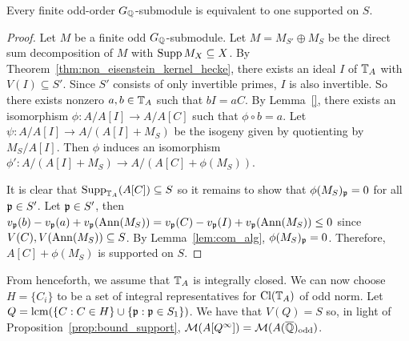 \documentclass[11pt, proquest]{uwthesis}
\begin{document}
\begin{proposition}%
    \label{prop:bound_support}
    Every finite odd-order $G_{\mathbb{Q}}$-submodule is equivalent to one supported on
    $S$.
\end{proposition}
\begin{proof}
    Let $M$ be a finite odd $G_{\mathbb{Q}}$-submodule. Let $M=M_{S'}\oplus M_S$ be the
    direct sum decomposition of $M$ with $\operatorname{Supp} M_X \subseteq X$. By
    Theorem~\ref{thm:non_eisenstein_kernel_hecke}, there exists an ideal
    $I$ of $\mathbb{T}_A$ with $V(I)\subseteq S'$. Since $S'$ consists of only
    invertible primes, $I$ is also invertible. So there exists nonzero $a,b\in
    \mathbb{T}_A$ such that $bI=aC$. By Lemma~\ref{}, there exists an isomorphism
    $\phi:A/A[I]\to A/A[C]$ such that $\phi\circ b = a$. Let $\psi:A/A[I]\to
    A/(A[I]+M_S)$ be the isogeny given by quotienting by $M_S/A[I]$. Then
    $\phi$ induces an isomorphism $\phi':A/(A[I]+M_S)\to A/(A[C]+\phi(M_S))$.

    It is clear that $\operatorname{Supp}_{\mathbb{T}_A}(A[C])\subseteq S$ so it remains to show
    that $\phi(M_S)_{\mathfrak{p}} =0$ for all $\mathfrak{p} \in S'$. Let $\mathfrak{p}\in S'$, then
    $v_{\mathfrak{p}}(b)-v_{\mathfrak{p}}(a)+v_{\mathfrak{p}}(\operatorname{Ann}(M_S))=v_{\mathfrak{p}}(C)-v_{\mathfrak{p}}(I)+v_{\mathfrak{p}}(\operatorname{Ann}(M_S)) \leq 0$
    since $V(C),V(\operatorname{Ann}(M_S))\subseteq S$. By Lemma~\ref{lem:com_alg},
    $\phi(M_S)_{\mathfrak{p}} = 0$. Therefore, $A[C]+\phi(M_S)$ is supported on $S$.
\end{proof}

From henceforth, we assume that $\mathbb{T}_A$ is integrally closed. We can now choose
$H=\{C_i\}$ to be a set of integral representatives for $\operatorname{Cl}(\mathbb{T}_A)$ of odd
norm. Let $Q=\operatorname{lcm}(\{C:C\in H\}\cup \{\mathfrak{p}:\mathfrak{p}\in S_1\})$. We have that $V(Q)=S$
so, in light of Proposition~\ref{prop:bound_support},
$\mathcal{M}(A[Q^\infty])=\mathcal{M}(A(\overline{\mathbb{Q}})_{\mathrm{odd}})$.
\end{document}
